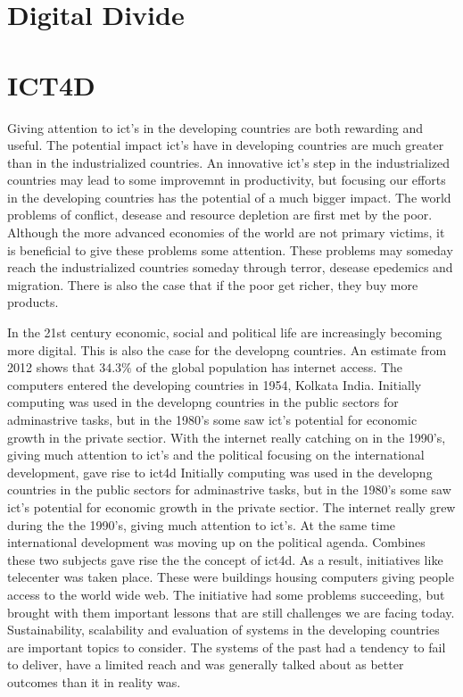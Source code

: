 \cite{ca:isdc}
\cite{sbs:gio}
\cite{offit:paan}




\section{Digital Divide}

\section{ICT4D}
Giving attention to \gls{ict}'s in the developing countries are both rewarding and useful. 
The potential impact \gls{ict}'s have in developing countries are much greater than in the industrialized countries. 
An innovative \gls{ict}'s step in the industrialized countries may lead to some improvemnt in productivity, but focusing our efforts in the developing countries has the potential of a much bigger impact.
The world problems of conflict, desease and resource depletion are first met by the poor. 
Although the more advanced economies of the world are not primary victims, it is beneficial to give these problems some attention.
These problems may someday reach the industrialized countries someday through terror, desease epedemics and migration. 
There is also the case that if the poor get richer, they buy more products. 


In the 21st century economic, social and political life are increasingly becoming more digital. 
This is also the case for the developng countries. An estimate from 2012 shows that  $34.3\%$ of the global population has internet access.
The computers entered the developing countries in 1954, Kolkata India.
Initially computing was used in the developng countries in the public sectors for adminastrive tasks, but in the 1980's some saw \gls{ict}'s potential for economic growth in the private sectior.
With the internet really catching on in the 1990's, giving much attention to \gls{ict}'s and the political focusing on the international development, gave rise to \gls{ict4d}
Initially computing was used in the developng countries in the public sectors for adminastrive tasks, but in the 1980's some saw \gls{ict}'s potential for economic growth in the private sectior.
The internet really grew during the the 1990's, giving much attention to \gls{ict}'s.
At the same time international development was moving up on the political agenda.
Combines these two subjects gave rise the the concept of \gls{ict4d}.
As a result, initiatives like telecenter was taken place.
These were buildings housing computers giving people access to the world wide web.
The initiative had some problems succeeding, but brought with them important lessons that are still challenges we are facing today.
Sustainability, scalability and evaluation of systems in the developing countries are important topics to consider.
The systems of the past had a tendency to fail to deliver, have a limited reach and was generally talked about as better outcomes than it in reality was.

